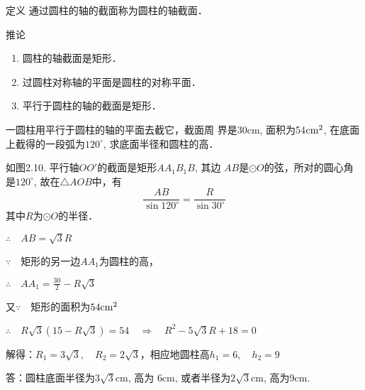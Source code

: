 \begin{blk}{定义}
    通过圆柱的轴的截面称为圆柱的轴截面．
\end{blk}

\begin{blk}{推论}
\begin{enumerate}
    \item 圆柱的轴截面是矩形．
    \item 过圆柱对称轴的平面是圆柱的对称平面．
    \item 平行于圆柱的轴的截面是矩形．
\end{enumerate}
\end{blk}

\begin{example}
    一圆柱用平行于圆柱的轴的平面去截它，截面周
界是30cm, 面积为54${\rm cm}^2$, 在底面上截得的一段弧为$120^{\circ}$, 求底面半径和圆柱的高．
\end{example}

\begin{figure}[htp]
    \centering
{}
    \caption{}
\end{figure}

\begin{solution}
    如图2.10. 平行轴$OO'$的截面是矩形$AA_1B_1B$, 其边
$AB$是$\odot O$的弦，所对的圆心角是$120^{\circ}$, 故在$\triangle AOB$中，有
\[\frac{AB}{\sin 120^{\circ}}=\frac{R}{\sin 30^{\circ}}\]
其中$R$为$\odot O$的半径．

$\therefore\quad AB=\sqrt{3}R$

$\because\quad $矩形的另一边$AA_1$为圆柱的高，

$\therefore\quad AA_1=\frac{30}{2}-R\sqrt{3}$

又$\because\quad $矩形的面积为$54{\rm cm^2}$

$\therefore\quad R\sqrt{3}\left(15-R\sqrt{3}\right)=54 \quad \Rightarrow\quad R^2-5\sqrt{3}R+18=0$

解得：$R_1=3\sqrt{3},\quad R_2=2\sqrt{3}$，相应地圆柱高$h_1=6,\quad h_2=9$

答：圆柱底面半径为$3\sqrt{3}$cm, 高为
6cm, 或者半径为$2\sqrt{3}$cm, 高为9cm.
\end{solution}



